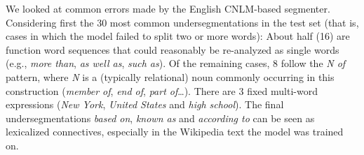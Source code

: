 


We looked at common errors made by the English CNLM-based segmenter. Considering first the 30 most common undersegmentations
in the test set (that is, cases in which the model failed to split two
or more words): About half (16) are function word
sequences that could reasonably be re-analyzed as single words (e.g.,
\emph{more than}, \emph{as well as}, \emph{such as}). Of the remaining
cases, 8 follow the \emph{N of} pattern, where \emph{N} is a
(typically relational) noun commonly occurring in this construction
(\emph{member of}, \emph{end of}, \emph{part of}\ldots). There are 3
fixed multi-word expressions (\emph{New York}, \emph{United States}
and \emph{high school}). The final undersegmentations \emph{based on}, \emph{known as} and
\emph{according to} can be seen as lexicalized connectives,
especially in the Wikipedia text the model was trained on.

